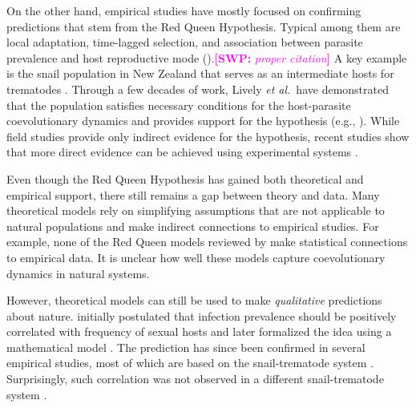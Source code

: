\documentclass{article}\usepackage[]{graphicx}\usepackage[]{color}
\newcommand{\etal}{\textit{et al.}}
\newcommand{\comment}[3]{\textcolor{#1}{\textbf{[#2: }\textit{#3}\textbf{]}}}
\newcommand{\swp}[1]{\comment{magenta}{SWP}{#1}}
\begin{document}
On the other hand, empirical studies have mostly focused on confirming predictions that stem from the Red Queen Hypothesis.
Typical among them are local adaptation, time-lagged selection, and association between parasite prevalence and host reproductive mode (\citep{tobler2008expanding, vergara2014infection}).\swp{proper citation}
A key example is the snail population in New Zealand that serves as an intermediate hosts for trematodes \citep{winterbourn1974larval, mcarthur1976suppression}.
Through a few decades of work, Lively \etal\ have demonstrated that the population satisfies necessary conditions for the host-parasite coevolutionary dynamics and provides support for the hypothesis (e.g., \cite{lively1987evidence, lively1989adaptation, dybdahl1995host, dybdahl1998host, jokela2009maintenance, vergara2014infection, gibson2016within}).
While field studies provide only indirect evidence for the hypothesis, 
recent studies show that more direct evidence can be achieved using experimental systems \citep{auld2016sex, slowinski2016coevolutionary}.

Even though the Red Queen Hypothesis has gained both theoretical and empirical support, there still remains a gap between theory and data.
Many theoretical models rely on simplifying assumptions that are not applicable to natural populations and make indirect connections to empirical studies.
For example, none of the Red Queen models reviewed by \cite{ashby2015diversity} make statistical connections to empirical data.
It is unclear how well these models capture coevolutionary dynamics in natural systems.

However, theoretical models can still be used to make \emph{qualitative} predictions about nature.
\cite{lively1992parthenogenesis} initially postulated that infection prevalence should be positively correlated with frequency of sexual hosts and later formalized the idea using a mathematical model \citep{lively2001trematode}.
The prediction has since been confirmed in several empirical studies, most of which are based on the snail-trematode system \citep{lively2002temporal, kumpulainen2004parasites, king2011parasites, vergara2013geographic, mckone2016fine, gibson2016within}.
Surprisingly, such correlation was not observed in a different snail-trematode system \citep{heller1990sexual, ben2005spatial, ben2007temporal, ben2008sex, dagan2013clonal}.
\end{document}
